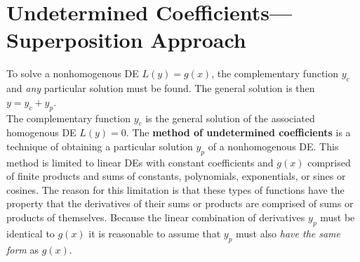 \documentclass[./Differential Equations]{subfiles}
\begin{document}
	\section{Undetermined Coefficients---Superposition Approach}
		To solve a nonhomogenous DE \(L(y) = g(x)\), the complementary function \(y_c\) and \textit{any} particular solution must be found. The general solution is then \(y = y_c + y_p\). \\
		The complementary function \(y_c\) is the general solution of the associated homogenous DE \(L(y) = 0\).
			The \textbf{method of undetermined coefficients} is a technique of obtaining a particular solution \(y_p\) of a nonhomogenous DE. This method is limited to linear DEs with constant coefficients and \(g(x)\) comprised of finite products and sums of constants, polynomials, exponentials, or sines or cosines. The reason for this limitation is that these types of functions have the property that the derivatives of their sums or products are comprised of sums or products of themselves. Because the linear combination of derivatives \(y_p\) must be identical to \(g(x)\) it is reasonable to assume that \(y_p\) must also \textit{have the same form} as \(g(x)\).
\end{document}
